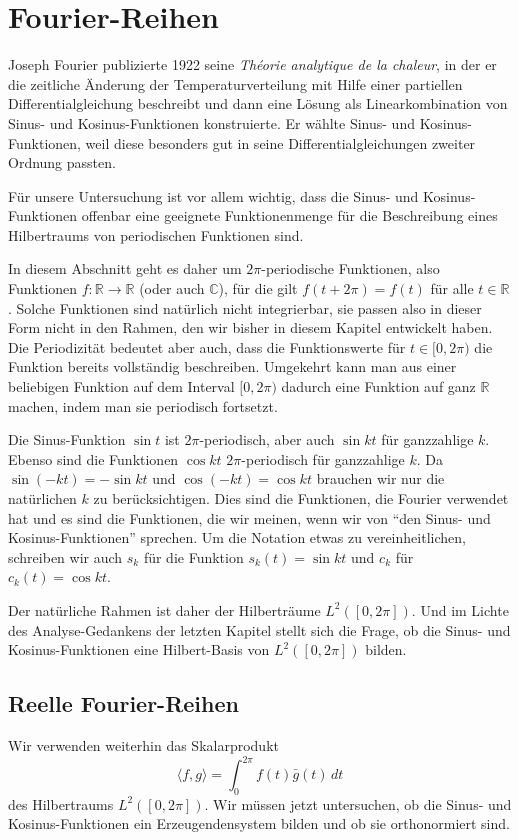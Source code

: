 %
%
%
\section{Fourier-Reihen
\label{section:fourier-reihen}}
Joseph Fourier publizierte 1922 seine {\em Théorie analytique de la chaleur},
in der er die zeitliche Änderung der Temperaturverteilung mit Hilfe einer
partiellen Differentialgleichung beschreibt und dann eine Lösung als
Linearkombination von Sinus- und Kosinus-Funktionen konstruierte. 
Er wählte Sinus- und Kosinus-Funktionen, weil diese besonders gut in
seine Differentialgleichungen zweiter Ordnung passten.

Für unsere Untersuchung ist vor allem wichtig, dass die Sinus- und
Kosinus-Funktionen offenbar eine geeignete Funktionenmenge für die
Beschreibung eines Hilbertraums von periodischen Funktionen sind.

In diesem Abschnitt geht es daher um $2\pi$-periodische Funktionen,
also Funktionen $f\colon \mathbb R\to \mathbb R$ (oder auch $\mathbb C$),
für die gilt $f(t+2\pi)= f(t)$ für alle $t\in\mathbb R$.  
Solche Funktionen sind natürlich nicht integrierbar, sie passen also
in dieser Form nicht in den Rahmen, den wir bisher in diesem Kapitel
entwickelt haben.
Die Periodizität bedeutet aber auch, dass die Funktionswerte für
$t\in[0,2\pi)$ die Funktion bereits vollständig beschreiben.
Umgekehrt kann man aus einer beliebigen Funktion auf dem Interval
$[0,2\pi)$ dadurch eine Funktion auf ganz $\mathbb R$ machen, indem
man sie periodisch fortsetzt.

Die Sinus-Funktion $\sin t$ ist $2\pi$-periodisch, aber auch 
$\sin kt$ für ganzzahlige $k$.
Ebenso sind die Funktionen $\cos kt$ $2\pi$-periodisch für ganzzahlige $k$.
Da $\sin(-kt)=-\sin kt$ und $\cos(-kt)=\cos kt$ brauchen wir nur die
natürlichen $k$ zu berücksichtigen.
Dies sind die Funktionen, die Fourier verwendet hat und es sind die
Funktionen, die wir meinen, wenn wir von ``den Sinus- und Kosinus-Funktionen''
sprechen.
Um die Notation etwas zu vereinheitlichen, schreiben wir auch $s_k$ für
die Funktion $s_k(t)=\sin kt$ und $c_k$ für $c_k(t)=\cos kt$.

Der natürliche Rahmen ist daher der Hilberträume $L^2([0,2\pi])$.
Und im Lichte des Analyse-Gedankens der letzten Kapitel stellt sich
die Frage, ob die Sinus- und Kosinus-Funktionen eine Hilbert-Basis
von $L^2([0,2\pi])$ bilden.

\subsection{Reelle Fourier-Reihen}
Wir verwenden weiterhin das Skalarprodukt
\[
\langle f,g\rangle
=
\int_0^{2\pi} f(t) \bar{g}(t)\,dt
\]
des Hilbertraums $L^2([0,2\pi])$.
Wir müssen jetzt untersuchen, ob die Sinus- und Kosinus-Funktionen
ein Erzeugendensystem bilden und ob sie orthonormiert sind.


